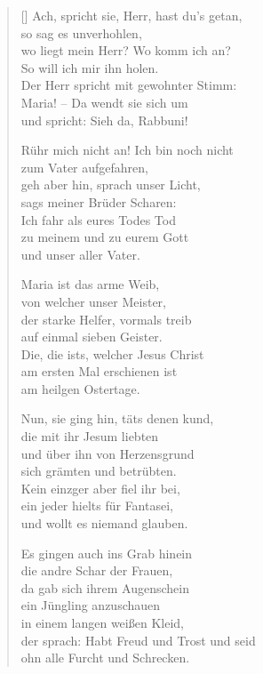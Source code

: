 \begin{multicols}{2}
\begin{verse}[\versewidth]
 Ach, spricht sie, Herr, hast du's getan,\\
so sag es unverhohlen,\\
wo liegt mein Herr? Wo komm ich an?\\
So will ich mir ihn holen.\\
Der Herr spricht mit gewohnter Stimm:\\
Maria! – Da wendt sie sich um\\
und spricht: Sieh da, Rabbuni!

 Rühr mich nicht an! Ich bin noch nicht\\
zum Vater aufgefahren,\\
geh aber hin, sprach unser Licht,\\
sags meiner Brüder Scharen:\\
Ich fahr als eures Todes Tod\\
zu meinem und zu eurem Gott\\
und unser aller Vater.

 Maria ist das arme Weib,\\
von welcher unser Meister,\\
der starke Helfer, vormals treib\\
auf einmal sieben Geister.\\
Die, die ists, welcher Jesus Christ\\
am ersten Mal erschienen ist\\
am heilgen Ostertage.

\vfill\null
\columnbreak
 
 Nun, sie ging hin, täts denen kund,\\
die mit ihr Jesum liebten\\
und über ihn von Herzensgrund\\
sich grämten und betrübten.\\
Kein einzger aber fiel ihr bei,\\
ein jeder hielts für Fantasei,\\
und wollt es niemand glauben.

 Es gingen auch ins Grab hinein\\
die andre Schar der Frauen,\\
da gab sich ihrem Augenschein\\
ein Jüngling anzuschauen\\
in einem langen weißen Kleid,\\
der sprach: Habt Freud und Trost und seid\\
ohn alle Furcht und Schrecken.


\end{verse}
\end{multicols}
